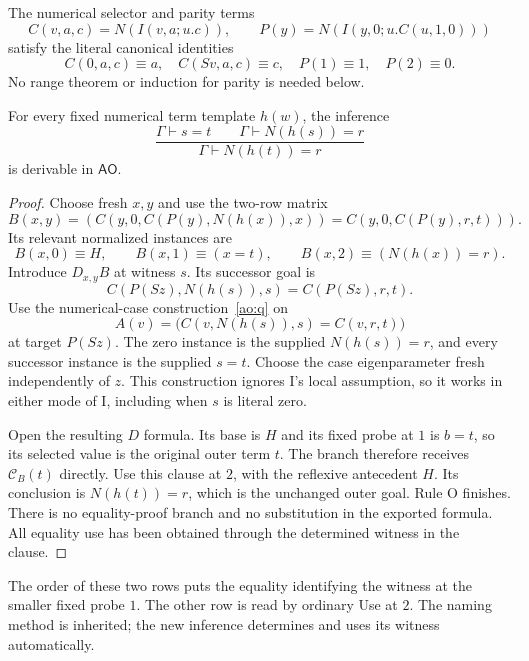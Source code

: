 The numerical selector and parity terms
\[
 C(v,a,c)=N(I(v,a;u.c)),\qquad
 P(y)=N(I(y,0;u.C(u,1,0)))
\]
satisfy the literal canonical identities
\[
 C(0,a,c)\equiv a,\quad C(Sv,a,c)\equiv c,
 \quad P(1)\equiv1,\quad P(2)\equiv0.
\]
No range theorem or induction for parity is needed below.

\begin{theorem}
\label{ao:transport}
For every fixed numerical term template $h(w)$, the inference
\[
 \frac{\Gamma\vdash s=t\qquad\Gamma\vdash N(h(s))=r}
      {\Gamma\vdash N(h(t))=r}
\]
is derivable in $\mathsf{AO}$.
\end{theorem}
\begin{proof}
Choose fresh $x,y$ and use the two-row matrix
\[
 B(x,y)=\left(
 C(y,0,C(P(y),N(h(x)),x))
 =C(y,0,C(P(y),r,t))\right).
 \tag{Rows}\label{ao:rows}
\]
Its relevant normalized instances are
\[
 B(x,0)\equiv H,\qquad
 B(x,1)\equiv(x=t),\qquad
 B(x,2)\equiv(N(h(x))=r).
\]
Introduce $D_{x,y}B$ at witness $s$.  Its successor goal is
\[
 C(P(Sz),N(h(s)),s)=C(P(Sz),r,t).
\]
Use the numerical-case construction~\eqref{ao:q} on
\[
 A(v)=\bigl(C(v,N(h(s)),s)=C(v,r,t)\bigr)
\]
at target $P(Sz)$.  The zero instance is the supplied $N(h(s))=r$,
and every successor instance is the supplied $s=t$.  Choose the case
eigenparameter fresh independently of $z$.  This construction ignores
I's local assumption, so it works in either mode of I, including when
$s$ is literal zero.

Open the resulting $D$ formula.  Its base is $H$ and its fixed probe at
$1$ is $b=t$, so its selected value is the original outer term $t$.
The branch therefore receives $\mathcal C_B(t)$ directly.  Use this
clause at $2$, with the reflexive antecedent $H$.  Its conclusion is
$N(h(t))=r$, which is the unchanged outer goal.  Rule O finishes.
There is no equality-proof branch and no substitution in the exported
formula.  All equality use has been obtained through the determined
witness in the clause.
\end{proof}

The order of these two rows puts the equality identifying the witness at
the smaller fixed probe $1$.  The other row is read by ordinary Use at
$2$.  The naming method is inherited; the new inference determines and
uses its witness automatically.

